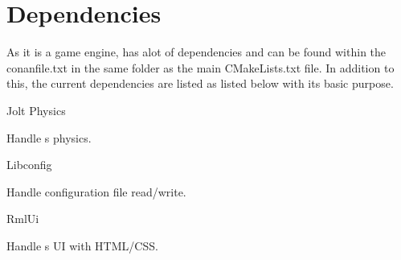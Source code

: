 \chapter{Dependencies}
\hypertarget{dependencies}{}\label{dependencies}


As it is a game engine,  has alot of dependencies and can be found within the conanfile.\+txt in the same folder as the main CMake\+Lists.\+txt file. In addition to this, the current dependencies are listed as listed below with it\textquotesingle{}s basic purpose.


\begin{DoxyItemize}
\item Jolt Physics
\begin{DoxyItemize}
\item Handle \textquotesingle{}s physics.
\end{DoxyItemize}
\item Libconfig
\begin{DoxyItemize}
\item Handle configuration file read/write.
\end{DoxyItemize}
\item Rml\+Ui
\begin{DoxyItemize}
\item Handle \textquotesingle{}s UI with HTML/\+CSS.
\end{DoxyItemize}
\item 
\end{DoxyItemize}